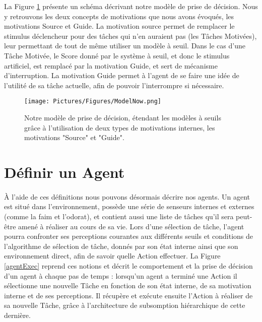 			La Figure \ref{ModelNowPres} présente un schéma décrivant notre modèle de prise de décision. Nous y retrouvons les deux concepts de motivations que nous avons évoqués, les motivations Source et Guide. La motivation source permet de remplacer le stimulus déclencheur pour des tâches qui n'en auraient pas (les Tâches Motivées), leur permettant de tout de même utiliser un modèle à seuil. Dans le cas d'une Tâche Motivée, le Score donné par le système à seuil, et donc le stimulus artificiel, est remplacé par la motivation Guide, et sert de mécanisme d'interruption. La motivation Guide permet à l'agent de se faire une idée de l'utilité de sa tâche actuelle, afin de pouvoir l'interrompre si nécessaire.
			
			
	\begin{figure}
	\centering
	\texttt{[image: Pictures/Figures/ModelNow.png]}
	\caption{Notre modèle de prise de décision, étendant les modèles à seuils grâce à l'utilisation de deux types de motivations internes, les motivations "Source" et "Guide".}
	\label{ModelNowPres}
	\end{figure}
			
	
	\section{Définir un Agent}	
	
		\paragraph{}
		À l'aide de ces définitions nous pouvons désormais décrire nos agents. Un agent est situé dans l'environnement, possède une série de senseurs internes et externes (comme la faim et l'odorat), et contient aussi une liste de tâches qu'il sera peut-être amené à réaliser au cours de sa vie. Lors d'une sélection de tâche, l'agent pourra confronter ses perceptions courantes aux différents seuils et conditions de l'algorithme de sélection de tâche, donnés par son état interne ainsi que son environnement direct, afin de savoir quelle Action effectuer. La Figure \ref{agentExec} reprend ces notions et décrit le comportement et la prise de décision d'un agent à chaque pas de temps : lorsqu'un agent a terminé une Action il sélectionne une nouvelle Tâche en fonction de son état interne, de sa motivation interne et de ses perceptions. Il récupère et exécute ensuite l'Action à réaliser de sa nouvelle Tâche, grâce à l'architecture de subsomption hiérarchique de cette dernière.
		
